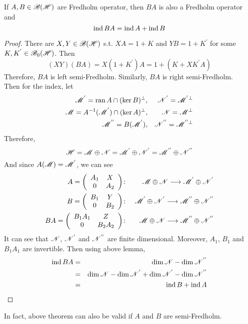 \begin{thm}
	If $A,B \in \mathscr{B(H)}$ are Fredholm operator, then $BA$ is also a Fredholm operator and
	\begin{equation*}
		\operatorname{ind}{BA} = \operatorname{ind}{A} + \operatorname{ind}{B}
	\end{equation*}
\end{thm}
\begin{proof}
	There are $X,Y \in \mathscr{B(H)}$ s.t. $XA = 1+K$ and $YB=1+K^{'}$ for some $K,K^{'} \in \mathscr{B}_{0}\mathscr{(H)}$. Then 
	\begin{equation*}
		(XY)(BA) = X(1+K^{'})A = 1 + (K+XK^{'}A)
	\end{equation*}
	Therefore, $BA$ is left semi-Fredholm. Similarly, $BA$ is right semi-Fredholm.\\
	Then for the index, let
	\begin{eqnarray*}
		\mathscr{M}^{'} = \operatorname{ran}{A} \cap (\ker{B})^{\bot} &,& \mathscr{N}^{'} = \mathscr{M}^{' \bot} \\
		\mathscr{M} = A^{-1}(\mathscr{M}^{'}) \cap (\ker{A})^{\bot} &,& \mathscr{N} = \mathscr{M}^{\bot} \\
		\mathscr{M}^{''} = B(\mathscr{M}^{'}) &,& \mathscr{N^{''}} = \mathscr{M}^{'' \bot}
	\end{eqnarray*}
	Therefore,
	\begin{equation*}
		\mathscr{H} = \mathscr{M} \oplus \mathscr{N} = \mathscr{M}^{'} \oplus \mathscr{N^{'}} = \mathscr{M}^{''} \oplus \mathscr{N^{''}}
	\end{equation*}
	And since $A(\mathscr{M}) = \mathscr{M}^{'}$, we can see
	\begin{eqnarray*}
		A = \left(
			\begin{array}{cc}
				A_1 & X \\
				0 & A_2
			\end{array}
		\right)
		&\colon& \mathscr{M} \oplus \mathscr{N} \longrightarrow \mathscr{M}^{'} \oplus \mathscr{N^{'}} \\
		B = \left(
			\begin{array}{cc}
				B_1 & Y \\
				0 & B_2
			\end{array}
		\right)
		&\colon& \mathscr{M}^{'} \oplus \mathscr{N^{'}} \longrightarrow \mathscr{M}^{''} \oplus \mathscr{N^{''}} \\
		BA = \left(
			\begin{array}{cc}
				B_1A_1 & Z \\
				0 & B_2A_2
			\end{array}
		\right)
		&\colon& \mathscr{M} \oplus \mathscr{N} \longrightarrow \mathscr{M}^{''} \oplus \mathscr{N^{''}}
	\end{eqnarray*}
	It can see that $\mathscr{N}$, $\mathscr{N^{'}}$ and $\mathscr{N^{''}}$ are finite dimensional. Moreover, $A_1$, $B_1$ and $B_1A_1$ are invertible. Then using above lemma,
	\begin{eqnarray*}
		\operatorname{ind}{BA} &=& \dim{\mathscr{N}} - \dim{\mathscr{N^{''}}} \\
		&=& \dim{\mathscr{N}} - \dim{\mathscr{N^{'}}} + \dim{\mathscr{N^{'}}} - \dim{\mathscr{N^{''}}} \\
		&=& \operatorname{ind}{B} + \operatorname{ind}{A}
	\end{eqnarray*}
\end{proof}
\begin{rem}
	In fact, above theorem can also be valid if $A$ and $B$ are semi-Fredholm.
\end{rem}

